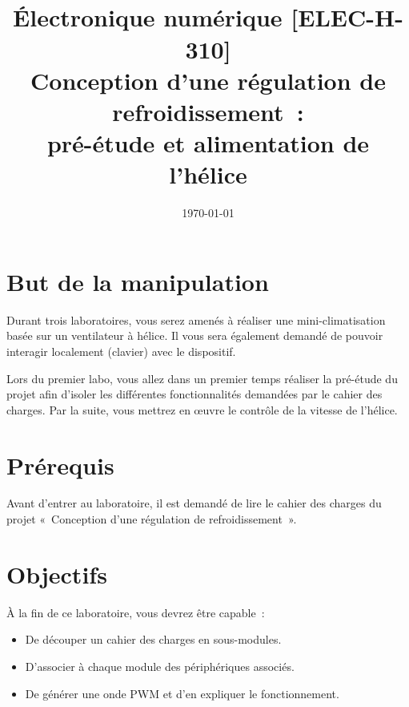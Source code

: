 \documentclass[11pt,a4paper]{article}
\date{\vspace{-1.7cm}\mydate\today}
\title{\vspace{-2cm}\labonumber \\ Électronique numérique [ELEC-H-310]\\Conception d'une régulation de refroidissement~: \\ pré-étude et alimentation de l'hélice\ifthenelse{\boolean{corrige}}{~\\Corrigé}{}}
\theoremstyle{definition}%
\begin{document}
\pagestyle{empty}
\maketitle





\section*{But de la manipulation}
Durant trois laboratoires, vous serez amenés à réaliser une mini-climatisation basée sur un ventilateur à hélice.
Il vous sera également demandé de pouvoir interagir localement (clavier) avec le dispositif.

Lors du premier labo, vous allez dans un premier temps réaliser la pré-étude du projet afin d’isoler les différentes fonctionnalités demandées par le cahier des charges.
Par la suite, vous mettrez en œuvre le contrôle de la vitesse de l’hélice.

\section*{Prérequis}
Avant d’entrer au laboratoire, il est demandé de lire le cahier des charges du projet «~Conception d’une régulation de refroidissement~».


\section*{Objectifs}
À la fin de ce laboratoire, vous devrez être capable~:
\begin{itemize}
	\item De découper un cahier des charges en sous-modules.
	\item D'associer à chaque module des périphériques associés.
	\item De générer une onde PWM et d'en expliquer le fonctionnement.
\end{itemize}


\newpage


\end{document}
